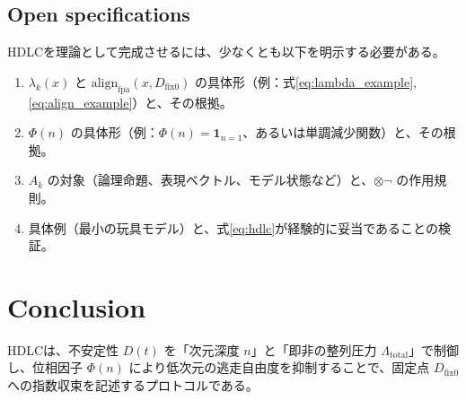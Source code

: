 \documentclass[12pt,a4paper]{article}
\newcommand{\dfix}{D_{\text{fix0}}}
\begin{document}
\subsection{Open specifications}
HDLCを理論として完成させるには、少なくとも以下を明示する必要がある。
\begin{enumerate}
  \item $\lambda_k(x)$ と $\mathrm{align}_{\mathrm{fpa}}(x,\dfix)$ の具体形（例：式\eqref{eq:lambda_example}, \eqref{eq:align_example}）と、その根拠。
  \item $\Phi(n)$ の具体形（例：$\Phi(n)=\mathbf{1}_{n=1}$、あるいは単調減少関数）と、その根拠。
  \item $A_k$ の対象（論理命題、表現ベクトル、モデル状態など）と、$\otimes\neg$ の作用規則。
  \item 具体例（最小の玩具モデル）と、式\eqref{eq:hdlc}が経験的に妥当であることの検証。
\end{enumerate}

\section{Conclusion}
HDLCは、不安定性 $D(t)$ を「次元深度 $n$」と「即非の整列圧力 $\Lambda_{\mathrm{total}}$」で制御し、位相因子 $\Phi(n)$ により低次元の逃走自由度を抑制することで、固定点 $\dfix$ への指数収束を記述するプロトコルである。
\end{document}

